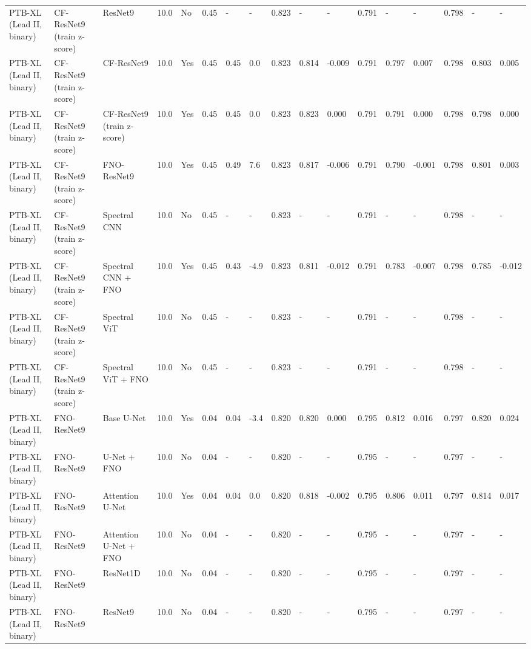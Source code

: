 \begin{longtable}{lllllllllllllllll}
PTB-XL (Lead II, binary) & CF-ResNet9 (train z-score) & ResNet9 & 10.0 & No & 0.45 & - & - & 0.823 & - & - & 0.791 & - & - & 0.798 & - & - \\
PTB-XL (Lead II, binary) & CF-ResNet9 (train z-score) & CF-ResNet9 & 10.0 & Yes & 0.45 & 0.45 & 0.0 & 0.823 & 0.814 & -0.009 & 0.791 & 0.797 & 0.007 & 0.798 & 0.803 & 0.005 \\
PTB-XL (Lead II, binary) & CF-ResNet9 (train z-score) & CF-ResNet9 (train z-score) & 10.0 & Yes & 0.45 & 0.45 & 0.0 & 0.823 & 0.823 & 0.000 & 0.791 & 0.791 & 0.000 & 0.798 & 0.798 & 0.000 \\
PTB-XL (Lead II, binary) & CF-ResNet9 (train z-score) & FNO-ResNet9 & 10.0 & Yes & 0.45 & 0.49 & 7.6 & 0.823 & 0.817 & -0.006 & 0.791 & 0.790 & -0.001 & 0.798 & 0.801 & 0.003 \\
PTB-XL (Lead II, binary) & CF-ResNet9 (train z-score) & Spectral CNN & 10.0 & No & 0.45 & - & - & 0.823 & - & - & 0.791 & - & - & 0.798 & - & - \\
PTB-XL (Lead II, binary) & CF-ResNet9 (train z-score) & Spectral CNN + FNO & 10.0 & Yes & 0.45 & 0.43 & -4.9 & 0.823 & 0.811 & -0.012 & 0.791 & 0.783 & -0.007 & 0.798 & 0.785 & -0.012 \\
PTB-XL (Lead II, binary) & CF-ResNet9 (train z-score) & Spectral ViT & 10.0 & No & 0.45 & - & - & 0.823 & - & - & 0.791 & - & - & 0.798 & - & - \\
PTB-XL (Lead II, binary) & CF-ResNet9 (train z-score) & Spectral ViT + FNO & 10.0 & No & 0.45 & - & - & 0.823 & - & - & 0.791 & - & - & 0.798 & - & - \\
PTB-XL (Lead II, binary) & FNO-ResNet9 & Base U-Net & 10.0 & Yes & 0.04 & 0.04 & -3.4 & 0.820 & 0.820 & 0.000 & 0.795 & 0.812 & 0.016 & 0.797 & 0.820 & 0.024 \\
PTB-XL (Lead II, binary) & FNO-ResNet9 & U-Net + FNO & 10.0 & No & 0.04 & - & - & 0.820 & - & - & 0.795 & - & - & 0.797 & - & - \\
PTB-XL (Lead II, binary) & FNO-ResNet9 & Attention U-Net & 10.0 & Yes & 0.04 & 0.04 & 0.0 & 0.820 & 0.818 & -0.002 & 0.795 & 0.806 & 0.011 & 0.797 & 0.814 & 0.017 \\
PTB-XL (Lead II, binary) & FNO-ResNet9 & Attention U-Net + FNO & 10.0 & No & 0.04 & - & - & 0.820 & - & - & 0.795 & - & - & 0.797 & - & - \\
PTB-XL (Lead II, binary) & FNO-ResNet9 & ResNet1D & 10.0 & No & 0.04 & - & - & 0.820 & - & - & 0.795 & - & - & 0.797 & - & - \\
PTB-XL (Lead II, binary) & FNO-ResNet9 & ResNet9 & 10.0 & No & 0.04 & - & - & 0.820 & - & - & 0.795 & - & - & 0.797 & - & - \\

\end{longtable}

